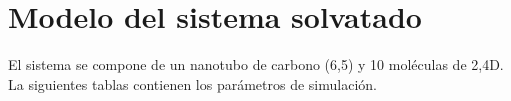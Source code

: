\chapter{Modelo del sistema solvatado}\label{chapter:apendicea}









El sistema se compone de un nanotubo de carbono (6,5) y 10 moléculas de 2,4D. La siguientes tablas contienen los parámetros de simulación.

